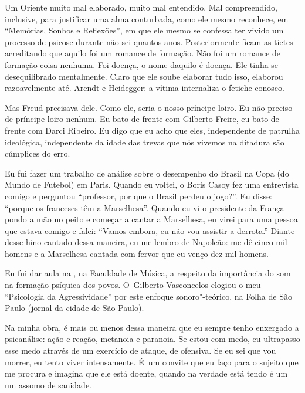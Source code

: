  

Um Oriente muito mal elaborado, muito mal entendido. Mal compreendido,
inclusive, para justificar uma alma conturbada, como ele mesmo
reconhece, em ``Memórias, Sonhos e Reflexões'', em que ele mesmo se
confessa ter vivido um processo de psicose durante não sei quantos anos.
Posteriormente ficam as tietes acreditando que aquilo foi um romance de
formação. Não foi um romance de formação coisa nenhuma. Foi doença, o
nome daquilo é doença. Ele tinha se desequilibrado mentalmente. Claro
que ele soube elaborar tudo isso, elaborou razoavelmente até. Arendt e
Heidegger: a vítima internaliza o fetiche conosco.

 

Mas Freud precisava dele. Como ele, seria o nosso príncipe loiro. Eu não
preciso de príncipe loiro nenhum. Eu bato de frente com Gilberto Freire,
eu bato de frente com Darci Ribeiro. Eu digo que eu acho 
que eles, independente de patrulha
ideológica, independente da idade das trevas que nós vivemos na ditadura
são cúmplices do erro.

 

Eu fui fazer um trabalho de análise sobre o desempenho do Brasil na Copa
(do Mundo de Futebol) em Paris. Quando eu voltei, o Boris Casoy fez uma
entrevista comigo e perguntou ``professor, por que o Brasil perdeu o
jogo?''. Eu disse: ``porque os franceses têm a Marselhesa''. Quando eu vi
o presidente da França pondo a mão no peito e começar a cantar a
Marselhesa, eu virei para uma pessoa que estava comigo e falei: ``Vamos
embora, eu não vou assistir a derrota.'' Diante desse hino cantado dessa
maneira, eu me lembro de Napoleão: me dê cinco mil homens e a
Marselhesa cantada com fervor que eu venço dez mil homens.

 

Eu fui dar aula na , na Faculdade de Música, a respeito da importância
do som na formação psíquica dos povos. O~Gilberto Vasconcelos elogiou o
meu ``Psicologia da Agressividade'' por este enfoque sonoro"-teórico, na
Folha de São Paulo (jornal da cidade de São Paulo).

 

Na minha obra, é mais ou menos dessa maneira que eu sempre tenho
enxergado a psicanálise: ação e reação, metanoia e paranoia. Se estou
com medo, eu ultrapasso esse medo através de um exercício de ataque, de
ofensiva. Se eu sei que vou morrer, eu tento viver intensamente. É~um
convite que eu faço para o sujeito que me procura e imagina que ele está
doente, quando na verdade está tendo é um um assomo de sanidade.

